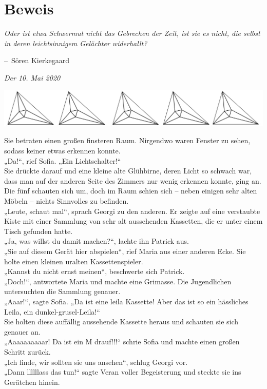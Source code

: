 \documentclass[oneside]{memoir}
\makeatletter
\newcommand{\parasep}{
\bigskip
\bigskip
\begin{center} 
   \includegraphics[scale=.08]{parasep5.jpg} 
\end{center}
\bigskip
\bigskip
}
\newenvironment{chapquote}[2][2em]
  {\setlength{\@tempdima}{#1}%
   \def\chapquote@author{#2}%
   \parshape 1 \@tempdima \dimexpr\textwidth-2\@tempdima\relax%
   \itshape}
  {\par\normalfont\hfill--\ \chapquote@author\hspace*{\@tempdima}\par\bigskip}
\makeatother
\begin{document}
\chapter{Beweis} %
\begin{chapquote}{Sören Kierkegaard}
\glqq Oder ist etwa Schwermut nicht das Gebrechen der Zeit, ist sie es nicht, die selbst in deren leichtsinnigem Gelächter widerhallt?\grqq
\end{chapquote}

\textit{Der 10. Mai 2020}


     
\parasep


Sie betraten einen großen finsteren Raum. Nirgendwo waren Fenster zu sehen, sodass keiner etwas erkennen konnte. \\
„Da!“, rief Sofia. „Ein Lichtschalter!“ \\
Sie drückte darauf und eine kleine alte Glühbirne, deren Licht so schwach war, dass man auf der anderen Seite des Zimmers nur wenig erkennen konnte, ging an.
Die fünf schauten sich um, doch im Raum schien sich -- neben einigen sehr alten Möbeln -- nichts Sinnvolles zu befinden. \\
„Leute, schaut mal“, sprach Georgi zu den anderen. Er zeigte auf eine verstaubte Kiste mit einer Sammlung von sehr alt aussehenden Kassetten, die er unter einem Tisch gefunden hatte. \\
„Ja, was willst du damit machen?“, lachte ihn Patrick aus. \\
„Sie auf diesem Gerät hier abspielen“, rief Maria aus einer anderen Ecke. Sie holte einen kleinen uralten Kassettenspieler. \\
„Kannst du nicht ernst meinen“, beschwerte sich Patrick. \\
„Doch!“, antwortete Maria und machte eine Grimasse.
Die Jugendlichen untersuchten die Sammlung genauer. \\
„Aaar!“, sagte Sofia. „Da ist eine leila Kassette! Aber das ist so ein hässliches Leila, ein dunkel-grusel-Leila!“ \\
Sie holten diese auffällig aussehende Kassette heraus und schauten sie sich genauer an. \\
„Aaaaaaaaaar! Da ist ein M drauf!!!“ schrie Sofia und machte einen großen Schritt zurück. \\
„Ich finde, wir sollten sie uns ansehen“, schlug Georgi vor. \\
„Dann llllllass das tun!“ sagte Veran voller Begeisterung und steckte sie ins Gerätchen hinein.
     
\end{document}
